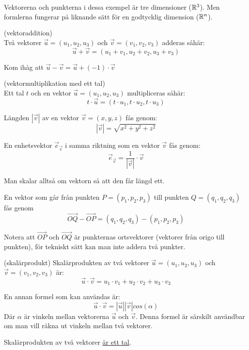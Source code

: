 \documentclass[../main.tex]{subfiles}
\begin{document}
Vektorerna och punkterna i dessa exempel är tre dimensioner ($\mathbb{R}^{3}$). Men formlerna fungerar på liknande sätt för en godtycklig dimension ($\mathbb{R}^{n}$).

\begin{formel}{(vektoraddition)}\\
\label{vecadd}
Två vektorer $\vec{u} = (u_1, u_2, u_3)$ och $\vec{v} = (v_1, v_2, v_3)$ adderas såhär:
\[
\vec{u} + \vec{v} = (u_1 + v_1, u_2 + v_2, u_3 + v_3)
\]

Kom ihåg att $\vec{u} - \vec{v} = \vec{u} + (-1)\cdot\vec{v}$
\end{formel}


\begin{formel}{(vektormultiplikation med ett tal)}\\
\label{vecscale}
Ett tal $t$ och en vektor $\vec{u} = (u_1, u_2, u_3)$ multipliceras såhär:
\[
t \cdot \vec{u} = (t \cdot u_1, t \cdot u_2, t \cdot u_3)
\]
\end{formel}



\begin{formel}
\label{veclength}
Längden $|\vec{v}|$ av en vektor $\vec{v} = (x, y, z)$ fås genom:
\[
|\vec{v}| = \sqrt{x^2+y^2+z^2}
\]

\end{formel}


\begin{formel}
\label{unitvec}
En enhetsvektor $\vec{e}_\vec{v}$ i samma riktning som en vektor $\vec{v}$ fås genom:
\[
    \vec{e}_{\vec{v}} = \frac{1}{|\vec{v}|} \cdot \vec{v} 
\]

Man skalar alltså om vektorn så att den får längd ett.
\end{formel}


\begin{formel}
\label{vecbetweendots}
En vektor som går från punkten $P = (p_1, p_2, p_3)$ till punkten $Q = (q_1, q_2, q_3)$ fås genom
$$\vec{OQ} - \vec{OP} = (q_1, q_2, q_3) - (p_1, p_2, p_3)$$

Notera att $\vec{OP}$ och $\vec{OQ}$ är punkternas ortsvektorer (vektorer från origo till punkten), för tekniskt sätt kan man inte addera två punkter.
\end{formel}


\begin{formel}{(skalärprodukt)}
\label{skalarprod}
Skalärprodukten av två vektorer $\vec{u} = (u_1, u_2, u_3)$ och $\vec{v} = (v_1, v_2, v_3)$ är:
\[
\vec{u} \cdot \vec{v} = u_1 \cdot v_1 + u_2 \cdot v_2 + u_3 \cdot v_3
\]

En annan formel som kan användas är: 
\[
\vec{u} \cdot \vec{v} = |\vec{u}||\vec{v}|cos(\alpha)
\]
Där $\alpha$ är vinkeln mellan vektorerna $\vec{u}$ och $\vec{v}$. Denna formel är särskilt användbar om man vill räkna ut vinkeln mellan två vektorer.

Skalärprodukten av två vektorer \underline{är ett tal}.
\end{formel}
\end{document}
